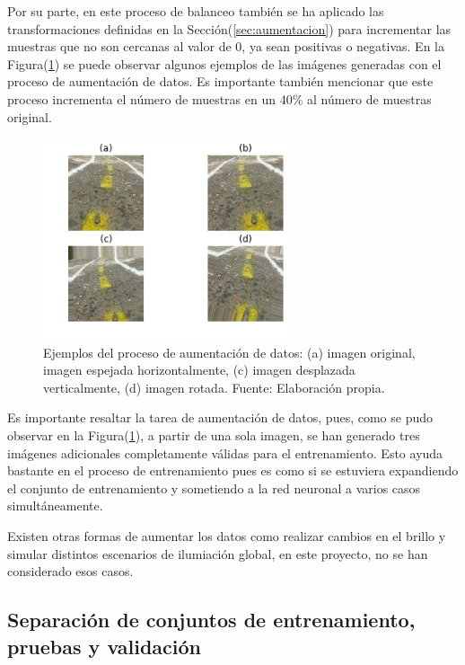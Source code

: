         Por su parte, 
        en este proceso de balanceo también se ha aplicado las transformaciones definidas en la Sección(\ref{sec:aumentacion}) 
        para incrementar las muestras que no son cercanas al valor de 0, ya sean positivas o negativas. En la Figura(\ref{fig:aumentacion}) se 
        puede observar algunos ejemplos de las imágenes generadas con el proceso de aumentación de datos. Es importante también 
        mencionar que este proceso incrementa el número de muestras en un 40\% al número de muestras original.

        \begin{figure}[!h] 
            \centering
            \includegraphics[width=0.65\textwidth]{img/aumentacion}
            \caption[Ejemplos de aumentación de datos]{Ejemplos del proceso de aumentación de datos: (a) imagen original, 
            imagen espejada horizontalmente, (c) imagen desplazada verticalmente, (d) imagen rotada. Fuente: Elaboración propia. }
            \label{fig:aumentacion}
        \end{figure}

        Es importante resaltar la tarea de aumentación de datos, pues, como se pudo observar en la Figura(\ref{fig:aumentacion}),
        a partir de una sola imagen, se han generado tres imágenes adicionales completamente válidas para el entrenamiento. Esto 
        ayuda bastante en el proceso de entrenamiento pues es como si se estuviera expandiendo el conjunto de entrenamiento 
        y sometiendo a la red neuronal a varios casos simultáneamente. 

        Existen otras formas de aumentar los datos como realizar cambios en el brillo y simular distintos escenarios 
        de ilumiación global, en este proyecto, no se han considerado esos casos.

    \subsection{Separación de conjuntos de entrenamiento, pruebas y validación}

